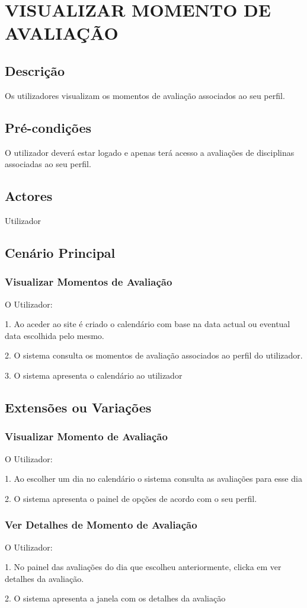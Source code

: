 \section{VISUALIZAR MOMENTO DE AVALIAÇÃO}

\subsection{Descrição}
Os utilizadores visualizam os momentos de avaliação associados ao seu perfil.	

\subsection{Pré-condições}
O utilizador deverá estar logado e apenas terá acesso a avaliações de disciplinas associadas ao seu perfil.

\subsection{Actores}
Utilizador

\subsection{Cenário Principal}

\subsubsection{Visualizar Momentos de Avaliação} 
O Utilizador:

1. Ao aceder ao site é criado o calendário com base na data actual ou eventual data escolhida pelo mesmo.

2. O sistema consulta os momentos de avaliação associados ao perfil do utilizador.

3. O sistema apresenta o calendário ao utilizador

\subsection{Extensões ou Variações} 
\subsubsection{Visualizar Momento de Avaliação}

O Utilizador:

1. Ao escolher um dia no calendário o sistema consulta as avaliações para esse dia 

2. O sistema apresenta o painel de opções de acordo com o seu perfil.

\subsubsection{Ver Detalhes de Momento de Avaliação}

O Utilizador:

1. No painel das avaliações do dia que escolheu anteriormente, clicka em ver detalhes da avaliação.

2. O sistema apresenta a janela com os detalhes da avaliação